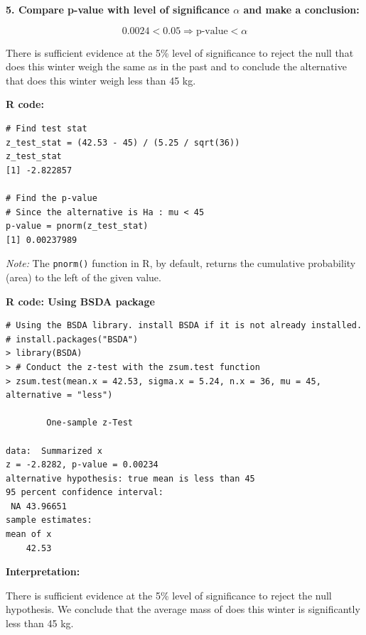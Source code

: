 \begin{example}
\textbf{5. Compare p-value with level of significance \(\alpha\) and make a conclusion:}

\[
0.0024 < 0.05 \Rightarrow \text{p-value} < \alpha
\]

There is sufficient evidence at the 5\% level of significance to reject the null that does this winter weigh the same as in the past and to conclude the alternative that does this winter weigh less than 45 kg.

\vspace{1em} %
\noindent\textbf{R code:}
\vspace{0.8em}
\begin{tcolorbox}[
  colback=gray!10, 
  colframe=black!45, 
  arc=2mm, 
  breakable, 
  after skip=0pt,  %
  before skip=0.3pt, %
  boxsep=1pt, left=4pt, right=4pt, top=2pt, bottom=2pt %
]
\begin{verbatim}
# Find test stat
z_test_stat = (42.53 - 45) / (5.25 / sqrt(36))
z_test_stat
[1] -2.822857

# Find the p-value
# Since the alternative is Ha : mu < 45
p-value = pnorm(z_test_stat)
[1] 0.00237989
\end{verbatim}
\end{tcolorbox}
\noindent\textit{Note:} The \texttt{pnorm()} function in R, by default, returns the cumulative probability (area) to the left of the given value. \\
\par\vspace{0.8em}  %
\noindent\textbf{R code: Using BSDA package}
\vspace{0.3em}

\begin{tcolorbox}[colback=gray!10, colframe=black!45, arc=2mm,
  breakable, boxsep=1pt, left=4pt, right=4pt, top=2pt, bottom=2pt,
  before skip=0pt, after skip=1em]
\small
\begin{verbatim}
# Using the BSDA library. install BSDA if it is not already installed.
# install.packages("BSDA")
> library(BSDA)
> # Conduct the z-test with the zsum.test function
> zsum.test(mean.x = 42.53, sigma.x = 5.24, n.x = 36, mu = 45, alternative = "less")

        One-sample z-Test

data:  Summarized x
z = -2.8282, p-value = 0.00234
alternative hypothesis: true mean is less than 45
95 percent confidence interval:
 NA 43.96651
sample estimates:
mean of x 
    42.53 
\end{verbatim}
\end{tcolorbox}

\vspace{1em}
\noindent\textbf{Interpretation:}

There is sufficient evidence at the 5\% level of significance to reject the null hypothesis. We conclude that the average mass of does this winter is significantly less than 45 kg.
\end{example}

